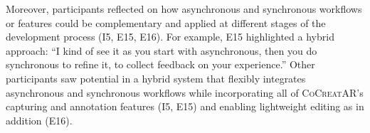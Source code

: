 Moreover, participants reflected on how asynchronous and synchronous workflows or features could be complementary and applied at different stages of the development process (I5, E15, E16). For example, E15 highlighted a hybrid approach: ``I kind of see it as you start with asynchronous, then you do synchronous to refine it, to collect feedback on your experience.'' Other participants saw potential in a hybrid system that flexibly integrates asynchronous and synchronous workflows while incorporating all of \textsc{CoCreatAR}'s capturing and annotation features (I5, E15) and enabling lightweight \insitu editing as in addition (E16).
